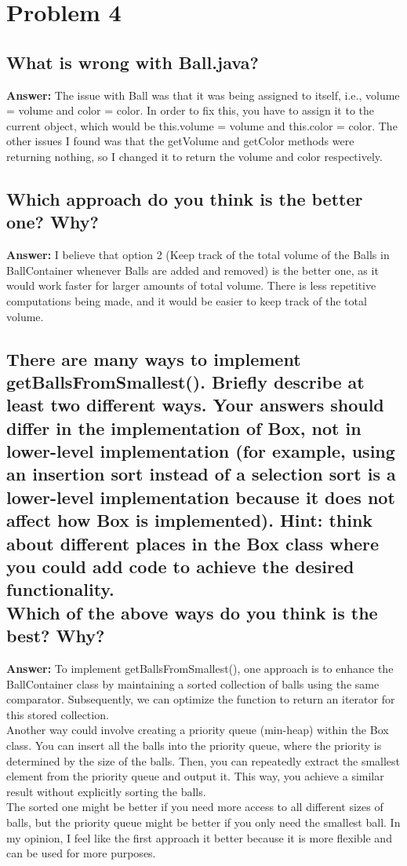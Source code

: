 \documentclass[11pt]{article}
\begin{document}
\section{Problem 4}

\subsection{What is wrong with Ball.java?}
\textbf{Answer:}
The issue with Ball was that it was being assigned to itself, i.e., volume = volume and color = color. 
In order to fix this, you have to assign it to the current object, which would be this.volume = volume and this.color = color.
The other issues I found was that the getVolume and getColor methods were returning nothing, so I changed it to return the volume and color respectively.

\subsection{Which approach do you think is the better one? Why?}
\textbf{Answer:}
I believe that option 2 (Keep track of the total volume of the Balls in BallContainer whenever Balls are added and removed)
is the better one, as it would work faster for larger amounts of total volume. There is less repetitive computations being made, and it would be easier to keep track of the total volume.

\subsection{There are many ways to implement getBallsFromSmallest(). Briefly describe at
least two different ways. Your answers should differ in the implementation of Box,
not in lower-level implementation (for example, using an insertion sort instead of
a selection sort is a lower-level implementation because it does not affect how Box
is implemented). Hint: think about different places in the Box class where you
could add code to achieve the desired functionality. \\Which of the above ways do you think is the best? Why?}
\textbf{Answer:}
To implement getBallsFromSmallest(), one approach is to enhance the BallContainer class by maintaining a sorted collection of balls using the same comparator. Subsequently, we can optimize the function to return an iterator for this stored collection.
\\Another way could involve creating a priority queue (min-heap) within the Box class. You can insert all the balls into the priority queue, where the priority is determined by the size of the balls. Then, you can repeatedly extract the smallest element from the priority queue and output it. This way, you achieve a similar result without explicitly sorting the balls.
\\The sorted one might be better if you need more access to all different sizes of balls, but the priority queue might be better if you only need the smallest ball. In my opinion, I feel like
the first approach it better because it is more flexible and can be used for more purposes.
\end{document}
